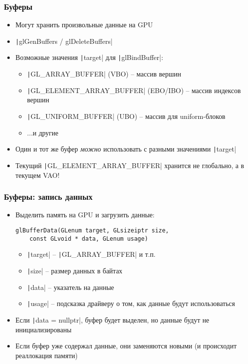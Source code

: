\documentclass[10pt]{beamer}
\begin{document}
\begin{frame}[fragile]
\frametitle{Буферы}
\begin{itemize}
\item Могут хранить произвольные данные на GPU
\pause
\item \texttt|glGenBuffers / glDeleteBuffers|
\pause
\item Возможные значения \texttt|target| для \texttt|glBindBuffer|:
\begin{itemize}
\item \texttt|GL_ARRAY_BUFFER| (VBO) -- массив вершин
\pause
\item \texttt|GL_ELEMENT_ARRAY_BUFFER| (EBO/IBO) -- массив индексов вершин
\pause
\item \texttt|GL_UNIFORM_BUFFER| (UBO) -- массив для uniform-блоков
\pause
\item ...и другие
\end{itemize}
\pause
\item Один и тот же буфер \textit{можно} использовать с разными значениями \texttt|target|
\pause
\item Текущий \texttt|GL_ELEMENT_ARRAY_BUFFER| хранится не глобально, а {\color{red}в текущем VAO!}
\end{itemize}
\end{frame}

\begin{frame}[fragile]
\frametitle{Буферы: запись данных}
\begin{itemize}
\item Выделить память на GPU и загрузить данные:
\begin{verbatim}
glBufferData(GLenum target, GLsizeiptr size,
    const GLvoid * data, GLenum usage)
\end{verbatim}
\vspace*{-0.5cm}
\pause
{}
\begin{itemize}
\item \texttt|target| -- \texttt|GL_ARRAY_BUFFER| и т.п.
\item \texttt|size| -- размер данных в байтах
\item \texttt|data| -- указатель на данные
\item \texttt|usage| -- подсказка драйверу о том, как данные будут использоваться
\end{itemize}
\pause
\item Если \texttt|data = nullptr|, буфер будет выделен, но данные будут не инициализированы
\pause
\item Если буфер уже содержал данные, они заменяются новыми (и происходит реаллокация памяти)
\end{itemize}
\end{frame}
\end{document}
